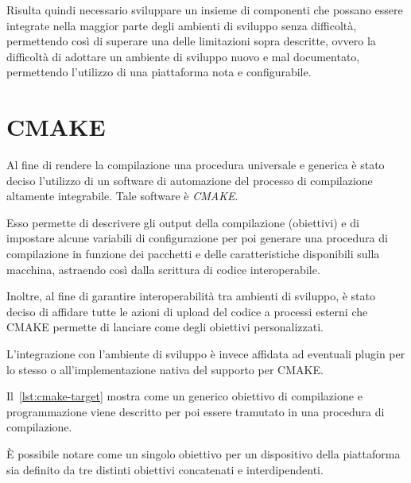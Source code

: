 Risulta quindi necessario sviluppare un insieme di componenti che possano essere integrate nella maggior parte degli ambienti di sviluppo senza difficoltà, permettendo così di superare una delle limitazioni sopra descritte, ovvero la difficoltà di adottare un ambiente di sviluppo nuovo e mal documentato, permettendo l'utilizzo di una piattaforma nota e configurabile.

\section{CMAKE}

Al fine di rendere la compilazione una procedura universale e generica è stato deciso l'utilizzo di un software di automazione del processo di compilazione altamente integrabile. Tale software è \textit{CMAKE}.

Esso permette di descrivere gli output della compilazione (obiettivi) e di impostare alcune variabili di configurazione per poi generare una procedura di compilazione in funzione dei pacchetti e delle caratteristiche disponibili sulla macchina, astraendo così dalla scrittura di codice interoperabile.

Inoltre, al fine di garantire interoperabilità tra ambienti di sviluppo, è stato deciso di affidare tutte le azioni di upload del codice a processi esterni che CMAKE permette di lanciare come degli obiettivi personalizzati.

L'integrazione con l'ambiente di sviluppo è invece affidata ad eventuali plugin per lo stesso o all'implementazione nativa del supporto per CMAKE.\@

Il~\cref{lst:cmake-target} mostra come un generico obiettivo di compilazione e programmazione viene descritto per poi essere tramutato in una procedura di compilazione.

È possibile notare come un singolo obiettivo per un dispositivo della piattaforma sia definito da tre distinti obiettivi concatenati e interdipendenti.

